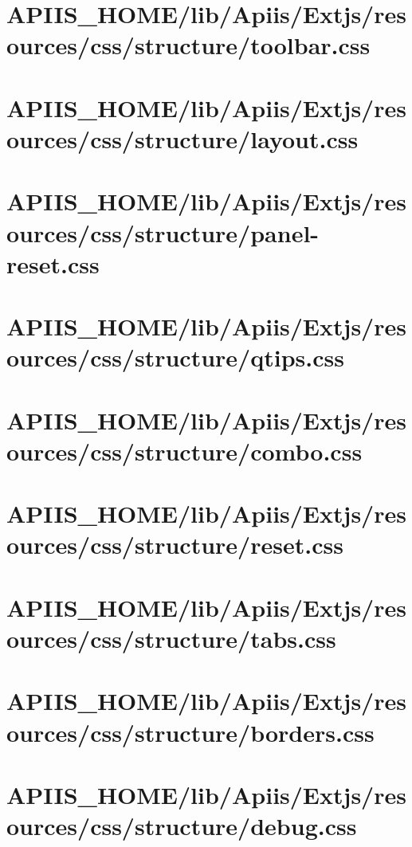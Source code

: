 \section{APIIS\_HOME/lib/Apiis/Extjs/resources/css/structure/toolbar.css} 
\section{APIIS\_HOME/lib/Apiis/Extjs/resources/css/structure/layout.css} 
\section{APIIS\_HOME/lib/Apiis/Extjs/resources/css/structure/panel-reset.css} 
\section{APIIS\_HOME/lib/Apiis/Extjs/resources/css/structure/qtips.css} 
\section{APIIS\_HOME/lib/Apiis/Extjs/resources/css/structure/combo.css} 
\section{APIIS\_HOME/lib/Apiis/Extjs/resources/css/structure/reset.css} 
\section{APIIS\_HOME/lib/Apiis/Extjs/resources/css/structure/tabs.css} 
\section{APIIS\_HOME/lib/Apiis/Extjs/resources/css/structure/borders.css} 
\section{APIIS\_HOME/lib/Apiis/Extjs/resources/css/structure/debug.css} 
